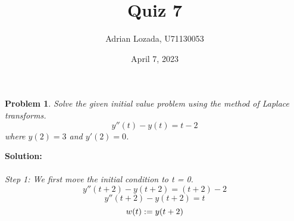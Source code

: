 \documentclass{article}
\title{Quiz 7}
\author{Adrian Lozada, U71130053}
\date{April 7, 2023}
\newtheorem{problem}{Problem}
\begin{document}
    \maketitle
    \newpage

    \begin{problem}
        Solve the given initial value problem using the method of Laplace transforms.
        \[y''(t) - y(t) = t - 2\] where $y(2) = 3$ and $y'(2) = 0$.
    \end{problem}
    \textbf{Solution:} \\ \\ 
    \textit{Step 1: We first move the initial condition to t = 0.} \\
    $$y''(t + 2) - y(t + 2) = (t + 2) - 2$$
    $$y''(t + 2) - y(t + 2) = t$$
     $$w(t) := y(t + 2) \\$$
     
\end{document}
